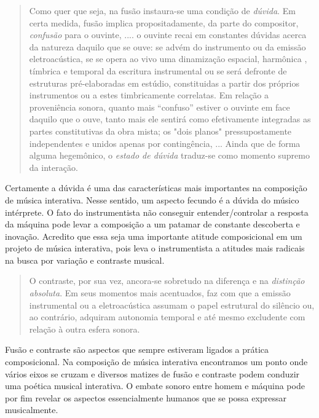 \documentclass[draft]{ppgmus}
\begin{document}
\begin{quote}
Como quer que seja, na fusão instaura-se uma condição de \textit{dúvida}.
Em certa medida, fusão implica propositadamente, da parte do compositor,
\textit{confusão} para o ouvinte,
....
o ouvinte recai em constantes dúvidas
acerca da natureza daquilo que se ouve: se advém do instrumento ou da 
emissão eletroacústica, se se opera ao vivo uma dinamização espacial, harmônica
, tímbrica e temporal da escritura instrumental ou se será defronte de
estruturas pré-elaboradas em estúdio, constituidas a partir dos próprios
instrumentos ou a estes timbricamente correlatas. Em relação a proveniência
sonora, quanto mais ``confuso'' estiver o ouvinte em face daquilo que
o ouve, tanto mais ele sentirá como efetivamente integradas as partes
constitutivas da obra mista; os "dois planos" pressupostamente independentes
e unidos apenas por contingência,
... 
Ainda que de forma alguma hegemônico, o \textit{estado de
dúvida} traduz-se como momento supremo da interação. \cite{menezes2006musica}
\end{quote}

Certamente a dúvida é uma das características mais importantes na composição
de música interativa. Nesse sentido, um aspecto fecundo é a dúvida do músico
intérprete. O fato do instrumentista não conseguir entender/controlar a resposta
da máquina pode levar a composição a um patamar de constante descoberta e inovação.
Acredito que essa seja uma importante atitude composicional em um projeto de 
música interativa, pois leva o instrumentista a atitudes mais radicais na 
busca por variação e contraste musical.

\begin{quote}
O contraste, por sua vez, ancora-se sobretudo na diferença e na 
\textit{distinção absoluta}. Em seus momentos mais acentuados, faz com
que a emissão instrumental ou a eletroacústica assumam o papel estrutural
do silêncio ou, ao contrário, adquiram autonomia temporal e até mesmo
excludente com relação à outra esfera sonora. \cite{menezes2006musica}
\end{quote}

Fusão e contraste são aspectos que sempre estiveram ligados a prática
composicional. Na composição de música interativa encontramos um ponto onde
vários eixos se cruzam e diversos matizes de fusão e contraste podem
conduzir uma poética musical interativa.
O embate sonoro entre homem e máquina pode por fim revelar os aspectos
essencialmente humanos que se possa expressar musicalmente. 
\end{document}
